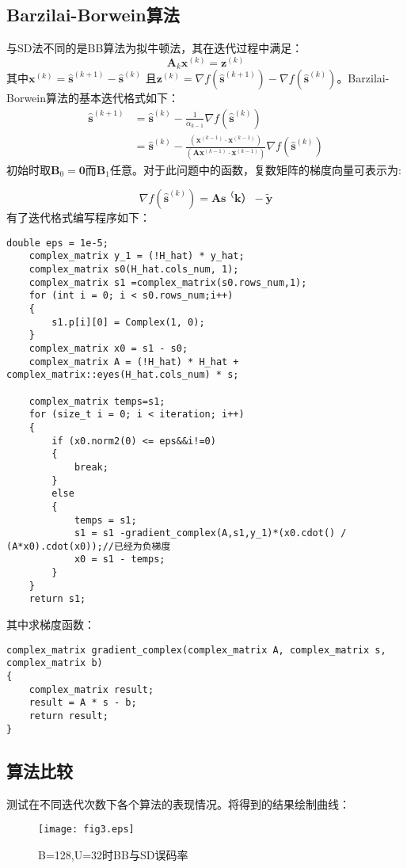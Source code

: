 \documentclass[twocolumn]{ctexart}
\begin{document}
\subsection{Barzilai-Borwein算法}
\par 与SD法不同的是BB算法为拟牛顿法，其在迭代过程中满足：
\[\mathbf{A}_{k} \mathbf{x}^{(k)}=\mathbf{z}^{(k)}\]
其中$ \mathbf{x}^{(k)}=\hat{\mathbf{s}}^{(k+1)}-\hat{\mathbf{s}}^{(k)} \text { 且} \mathbf{z}^{(k)}=\nabla f\left(\hat{\mathbf{s}}^{(k+1)}\right)-\nabla f\left(\hat{\mathbf{s}}^{(k)}\right) $。Barzilai-Borwein算法的基本迭代格式如下：
\[\begin{aligned}
\hat{\mathbf{s}}^{(k+1)} &=\hat{\mathbf{s}}^{(k)}-\frac{1}{\alpha_{k-1}} \nabla f\left(\hat{\mathbf{s}}^{(k)}\right) \\
&=\hat{\mathbf{s}}^{(k)}-\frac{\left(\mathbf{x}^{(k-1)} \cdot \mathbf{x}^{(k-1)}\right)}{\left(\mathbf{A} \mathbf{x}^{(k-1)} \cdot \mathbf{x}^{(k-1)}\right)} \nabla f\left(\hat{\mathbf{s}}^{(k)}\right)
\end{aligned}\]
初始时取$ \mathbf{B}_0=\mathbf{0}\text{而} \mathbf{B}_1 $任意。对于此问题中的函数，复数矩阵的梯度向量可表示为:

\[\nabla f\left(\hat{\mathbf{s}}^{(k)}\right)=\mathbf{As^（k）}-\tilde{\mathbf{y}}\]
有了迭代格式编写程序如下：
\begin{lstlisting}
double eps = 1e-5;
	complex_matrix y_1 = (!H_hat) * y_hat;
	complex_matrix s0(H_hat.cols_num, 1);
	complex_matrix s1 =complex_matrix(s0.rows_num,1);
	for (int i = 0; i < s0.rows_num;i++)
	{
		s1.p[i][0] = Complex(1, 0);
	}
	complex_matrix x0 = s1 - s0;
	complex_matrix A = (!H_hat) * H_hat + complex_matrix::eyes(H_hat.cols_num) * s;

	complex_matrix temps=s1;
	for (size_t i = 0; i < iteration; i++)
	{
		if (x0.norm2(0) <= eps&&i!=0)
		{
			break;
		}
		else
		{
			temps = s1;
			s1 = s1 -gradient_complex(A,s1,y_1)*(x0.cdot() / (A*x0).cdot(x0));//已经为负梯度
			x0 = s1 - temps;
		}
	}
	return s1;
\end{lstlisting}
\quad 其中求梯度函数：
\begin{lstlisting}
complex_matrix gradient_complex(complex_matrix A, complex_matrix s, complex_matrix b)
{
	complex_matrix result;
	result = A * s - b;
	return result;
}
\end{lstlisting}
\subsection{算法比较}
\par 测试在不同迭代次数下各个算法的表现情况。将得到的结果绘制曲线：
\begin{figure}[htpb]
\centering
\texttt{[image: fig3.eps]}
\caption{B=128,U=32时BB与SD误码率}
\end{figure}
\end{document}
